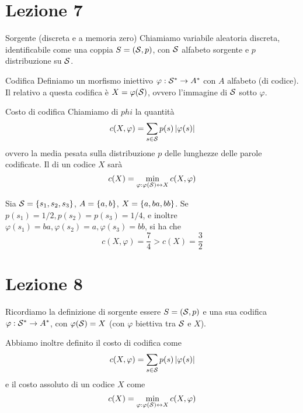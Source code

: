 \chapter{Lezione 7}


\begin{definition}{Sorgente (discreta e a memoria zero)}
  Chiamiamo  variabile aleatoria discreta, identificabile come una coppia \(S = (\mathcal{S},p)\), con \(\mathcal{S}\) alfabeto sorgente e \(p\) distribuzione su \(\mathcal{S}\).
\end{definition}
\begin{definition}{Codifica}
  Definiamo  un morfismo iniettivo \(\varphi: \mathcal{S}^* \to A^*\) con \(A\) alfabeto (di codice).
  Il  relativo a questa codifica è \(X = \varphi(\mathcal{S})\), ovvero l'immagine di \(\mathcal{S}\) sotto \(\varphi\).
\end{definition}
\begin{definition}{Costo di codifica}
  Chiamiamo  di \(phi\) la quantità
  \[c(X,\varphi) = \sum_{s \in \mathcal{S}} p(s) \left|\varphi(s)\right|\]
  ovvero la media pesata sulla distribuzione \(p\) delle lunghezze delle parole codificate.
  Il  di un codice \(X\) sarà
  \[c(X) = \min_{\varphi: \varphi(\mathcal{S}) \leftrightarrow  X} c(X,\varphi)\]
\end{definition}

\begin{example}[label=ex:codifica]{}
  Sia \(\SCal = \set{s_1,s_2,s_3}\), \(A = \set{a,b}\), \(X = \set{a,ba,bb}\).
  Se \(p(s_1) = 1/2, p(s_2) = p(s_3) = 1/4\), e inoltre \(\varphi(s_1) = ba, \varphi(s_2) = a, \varphi(s_3) = bb\), si ha che
    \[c(X,\varphi) = \frac{7}{4} > c(X) = \frac{3}{2}\]
\end{example}

\chapter{Lezione 8}

Ricordiamo la definizione di sorgente essere \(S = (\mathcal{S}, p)\) e una sua codifica \(\varphi: \mathcal{S}^* \to A^*\),  con \(\varphi(\mathcal{S}) = X\) (con \(\varphi\) biettiva tra \(\mathcal{S}\) e \(X\)).

Abbiamo inoltre definito il costo di codifica come
\[c(X,\varphi) = \sum_{s \in \mathcal{S}} p(s) \left|\varphi(s)\right|\]
e il costo assoluto di un codice \(X\) come
\[c(X) = \min_{\varphi: \varphi(\mathcal{S}) \leftrightarrow X} c(X,\varphi)\]

